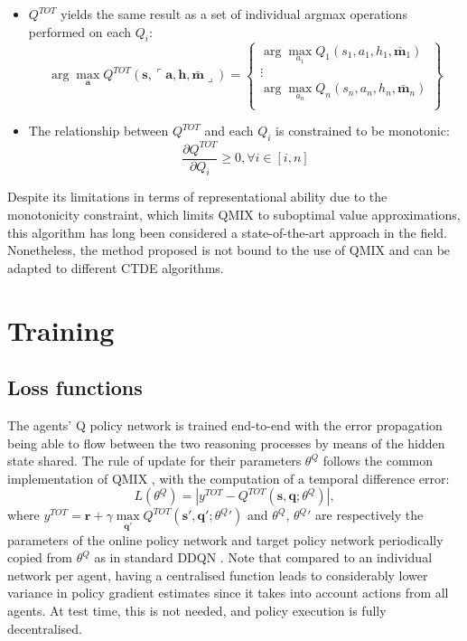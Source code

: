 \documentclass[a4paper,singleside,12pt]{report} %
\begin{document}
\begin{itemize}
\item
  \(Q^{TOT}\) yields the same result as a set of individual argmax operations performed on each \(Q_i\):
  \begin{equation}
  \arg\max_{\textbf{a}} Q^{TOT}(\textbf{s},\ulcorner\textbf{a},\textbf{h},\bar{\textbf{m}}\lrcorner) = \begin{Bmatrix}
  \arg\max_{a_1} Q_1(s_1,a_1,h_1,\bar{\textbf{m}}_1) \\
  \vdots\\
  \arg\max_{a_n} Q_n(s_n,a_n,h_n,\bar{\textbf{m}}_n) \\
  \end{Bmatrix}
  \end{equation}
\item
  The relationship between \(Q^{TOT}\) and each \(Q_i\) is constrained to be monotonic:
  \begin{equation}
  \frac{\partial Q^{TOT}}{\partial Q_i} \geq 0, \forall i \in [i,n]
  \end{equation}
\end{itemize}

Despite its limitations in terms of representational ability due to the monotonicity constraint, which limits QMIX to suboptimal value approximations, this algorithm has long been considered a state-of-the-art approach in the field. Nonetheless, the method proposed is not bound to the use of QMIX and can be adapted to different CTDE algorithms.

\section{Training}\label{training}

\subsection{Loss functions}\label{loss}
The agents' Q policy network is trained end-to-end with the error propagation being able to flow between the two reasoning processes by means of the hidden state shared. The rule of update for their parameters \(\theta^Q\) follows the common implementation of QMIX \cite{Rashid2018QMIXMV}, with the computation of a temporal difference error:
  \begin{equation}
    L(\theta^Q) = |y^{TOT} - Q^{TOT}(\textbf{s}, \textbf{q}; \theta^Q)|,
  \end{equation}
where $y^{TOT} = \textbf{r} + \gamma \max\limits_{\textbf{q}'}Q^{TOT}(\textbf{s}', \textbf{q}'; \theta^{Q}{'})$ and \(\theta^Q\), \(\theta^{Q}{'}\) are respectively the parameters of the online policy network and target policy network periodically copied from \(\theta^Q\) as in standard DDQN \cite{Van2016deep}. Note that compared to an individual network per agent, having a centralised function leads to considerably lower variance in policy gradient estimates since it takes into account actions from all agents. At test time, this is not needed, and policy execution is fully decentralised.
\end{document}
